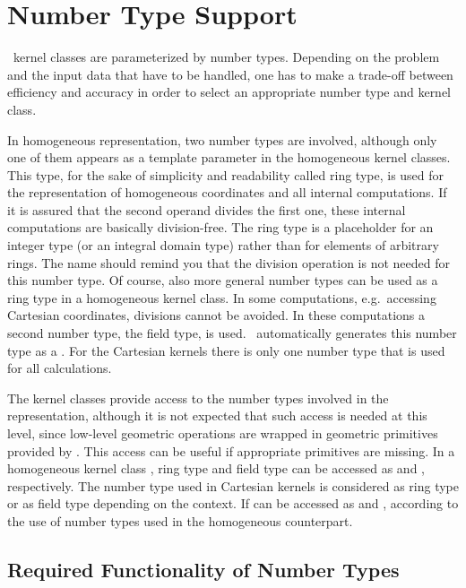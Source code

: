 \cleardoublepage
\chapter{Number Type Support}\label{Numbertype}

\cgal\ kernel classes are parameterized by number types.  
Depending on the problem and the input data that have to be handled,
one has to make a trade-off between efficiency and accuracy in 
order to select an appropriate number type and kernel class.

In homogeneous representation, two number types are involved,
although only one of them appears as a template parameter in
the homogeneous kernel classes.
This type, for the sake of simplicity and readability called ring type, is
used for the representation of homogeneous coordinates and all 
internal computations. 
If it is assured that the second operand divides the first one, these 
internal computations are basically division-free.
The ring type is a placeholder for an integer type (or an integral 
domain type) rather than for elements of arbitrary rings. 
The name should remind you that the division operation is not
needed for this number type.
Of course, also more general number types can be used as a ring type 
in a homogeneous kernel class. In some computations, e.g.\ accessing 
Cartesian coordinates, divisions cannot be avoided. In these computations a 
second number type, the field type, is used. \cgal\ automatically generates 
this number type as a . For the Cartesian kernels 
there is only one number type that is used for all calculations.

The kernel classes provide access to the number types 
involved in the representation, although it is not expected that
such access is needed at this level, since low-level geometric 
operations are wrapped in geometric primitives provided by \cgal.
This access can be useful if appropriate primitives are missing.
In a homogeneous kernel class , ring type and field
type can be accessed as  and , respectively.
The number type used in Cartesian kernels is considered as 
ring type or as field type depending on the context.
If can be accessed as  and , according
to the use of number types used in the homogeneous counterpart.

\section{Required Functionality of Number Types\label{nt-requirements}}

